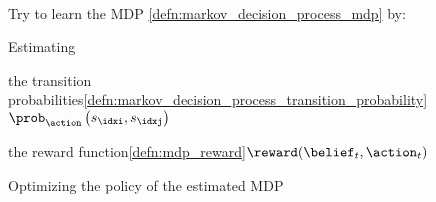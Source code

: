 \begin{propositionbox}\nospacing
  \begin{proposition}\label{proposition:model_based_rl}\leavevmode\\
    Try to learn the MDP \cref{defn:markov_decision_process_mdp} by:
    \begin{circlelistnosep}
      \item Estimating
    \begin{itemizenosep}
      \item the transition probabilities\cref{defn:markov_decision_process_transition_probability}\hfill$\prob_{\action}\left(s_{\idxi},s_{\idxj}\right)$
      \item the reward function\cref{defn:mdp_reward}\hfill$\reward(\belief_{t},\action_{t})$
    \end{itemizenosep}
    \item Optimizing the policy of the estimated MDP
    \end{circlelistnosep}
  \end{proposition}
\end{propositionbox}
